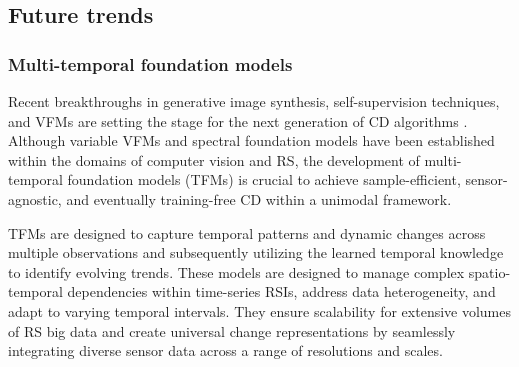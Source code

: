 \begin{comment}
    
\subsubsection{Interactivity and Accessibility of CD Insights}

Making change detection results accessible and interpretable to non-experts and enabling efficient interaction with CD systems are ongoing challenges \cite{li2023lrr,Li2024Learning}. Traditional methods often produce outputs that require specialized knowledge for comprehension and do not support intuitive querying. Further analysis or post-processing is necessary to transform CD results into detailed, contextual insights. For example, in the common CD paradigm, the categories of detected changes are predefined and do not support interactive selection by users. Summarizing the change statistics and ongoing trends also requires specialized expertise.

\end{comment}

\subsection{Future trends}


\subsubsection{Multi-temporal foundation models}

Recent breakthroughs in generative image synthesis, self-supervision techniques, and VFMs are setting the stage for the next generation of CD algorithms \cite{ding2024samcd, zheng2024segment}. Although variable VFMs \cite{Kirillov2023Segment} and spectral foundation models \cite{hong2024spectralgpt, guo2024skysense} have been established within the domains of computer vision and RS, the development of multi-temporal foundation models (TFMs) is crucial to achieve sample-efficient, sensor-agnostic, and eventually training-free CD within a unimodal framework.

TFMs are designed to capture temporal patterns and dynamic changes across multiple observations and subsequently utilizing the learned temporal knowledge to identify evolving trends. These models are designed to manage complex spatio-temporal dependencies within time-series RSIs, address data heterogeneity, and adapt to varying temporal intervals. They ensure scalability for extensive volumes of RS big data and create universal change representations by seamlessly integrating diverse sensor data across a range of resolutions and scales.



